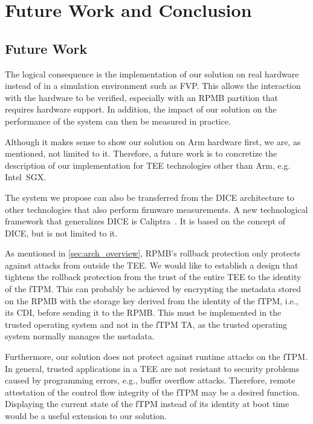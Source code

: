 
\chapter{Future Work and Conclusion}\label{chapter:future_work_and_conclusion}

\section{Future Work}

The logical consequence is the implementation of our solution on real hardware instead of in a simulation environment such as FVP\@.
This allows the interaction with the hardware to be verified, especially with an RPMB partition that requires hardware support.
In addition, the impact of our solution on the performance of the system can then be measured in practice.

Although it makes sense to show our solution on Arm hardware first, we are, as mentioned, not limited to it.
Therefore, a future work is to concretize the description of our implementation for TEE technologies other than Arm, e.g. Intel~SGX\@.

The system we propose can also be transferred from the DICE architecture to other technologies that also perform firmware measurements.
A new technological framework that generalizes DICE is Caliptra~\cite{caliptra}.
It is based on the concept of DICE, but is not limited to it.

As mentioned in \autoref{sec:arch_overview}, RPMB's rollback protection only protects against attacks from outside the TEE\@.
We would like to establish a design that tightens the rollback protection from the trust of the entire TEE to the identity of the fTPM\@.
This can probably be achieved by encrypting the metadata stored on the RPMB with the storage key derived from the identity of the fTPM, i.e., its CDI, before sending it to the RPMB\@.
This must be implemented in the trusted operating system and not in the fTPM TA, as the trusted operating system normally manages the metadata.

Furthermore, our solution does not protect against runtime attacks on the fTPM\@.
In general, trusted applications in a TEE are not resistant to security problems caused by programming errors, e.g., buffer overflow attacks.
Therefore, remote attestation of the control flow integrity of the fTPM may be a desired function.
Displaying the current state of the fTPM instead of its identity at boot time would be a useful extension to our solution.



